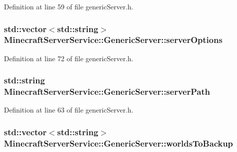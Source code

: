 Definition at line 59 of file generic\+Server.\+h.

\subsubsection[{\texorpdfstring{server\+Options}{serverOptions}}]{\setlength{\rightskip}{0pt plus 5cm}std\+::vector$<$std\+::string$>$ Minecraft\+Server\+Service\+::\+Generic\+Server\+::server\+Options\hspace{0.3cm}{\ttfamily [protected]}}\hypertarget{class_minecraft_server_service_1_1_generic_server_a1d5d6d5242a619f299427d18ab3969eb}{}\label{class_minecraft_server_service_1_1_generic_server_a1d5d6d5242a619f299427d18ab3969eb}


Definition at line 72 of file generic\+Server.\+h.

\subsubsection[{\texorpdfstring{server\+Path}{serverPath}}]{\setlength{\rightskip}{0pt plus 5cm}std\+::string Minecraft\+Server\+Service\+::\+Generic\+Server\+::server\+Path\hspace{0.3cm}{\ttfamily [protected]}}\hypertarget{class_minecraft_server_service_1_1_generic_server_a10ccbcf30f81af95aa5e75726f2c1d80}{}\label{class_minecraft_server_service_1_1_generic_server_a10ccbcf30f81af95aa5e75726f2c1d80}


Definition at line 63 of file generic\+Server.\+h.

\subsubsection[{\texorpdfstring{worlds\+To\+Backup}{worldsToBackup}}]{\setlength{\rightskip}{0pt plus 5cm}std\+::vector$<$std\+::string$>$ Minecraft\+Server\+Service\+::\+Generic\+Server\+::worlds\+To\+Backup\hspace{0.3cm}{\ttfamily [protected]}}\hypertarget{class_minecraft_server_service_1_1_generic_server_a4add7010fca034d10e98ee0adb1c36cc}{}\label{class_minecraft_server_service_1_1_generic_server_a4add7010fca034d10e98ee0adb1c36cc}


